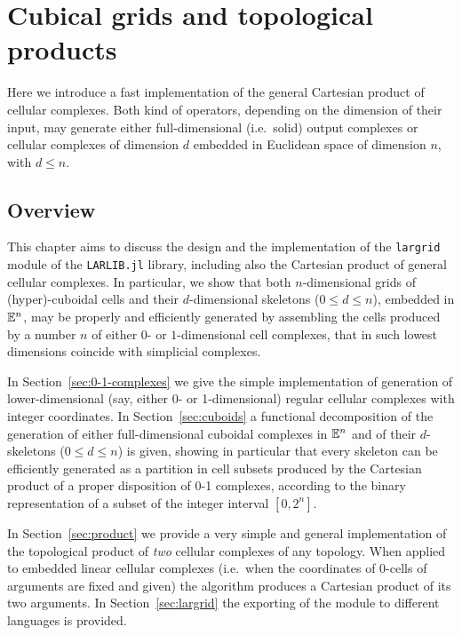 \chapter{Cubical grids and topological products}


Here we introduce a fast implementation of the general Cartesian product of cellular complexes. Both kind of operators, depending on the dimension of their input, may generate either full-dimensional (i.e.~solid) output complexes or cellular complexes of dimension $d$ embedded in Euclidean space of dimension $n$, with $d\leq n$. 

\section{Overview}
This chapter aims to discuss the design and the implementation of the \texttt{largrid} module of the \texttt{LARLIB.jl} library, including also the Cartesian product of general cellular complexes. 
In particular, we show that both $n$-dimensional grids of (hyper)-cuboidal cells and their  $d$-dimensional skeletons ($0\leq d\leq n$), embedded in $\mathbb{E}^n$, may be properly and efficiently generated by assembling the cells produced by a number $n$ of either $0$- or $1$-dimensional cell complexes, that in such lowest dimensions coincide with simplicial complexes. 

In Section~\ref{sec:0-1-complexes} we give the simple implementation of generation of lower-dimensional (say, either 0- or 1-dimensional) regular cellular complexes with integer coordinates.
In Section~\ref{sec:cuboids} a functional decomposition of the generation of either full-dimensional cuboidal complexes in $\mathbb{E}^n$ and of their $d$-skeletons ($0\leq d\leq n$) is given, showing in particular that every skeleton can be efficiently generated as a partition in cell subsets produced by the Cartesian product of a proper disposition of 0-1 complexes, according to the binary representation of a subset of the integer interval $[0,2^n]$.

In Section~\ref{sec:product} we provide a very simple and general implementation of the topological product of \emph{two} cellular complexes of any topology. When applied to embedded linear cellular complexes (i.e.~when the coordinates of 0-cells of arguments are fixed and given) the algorithm produces a Cartesian product of its two arguments.
In Section~\ref{sec:largrid} the exporting of the module to different languages is provided.

